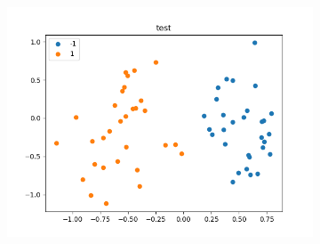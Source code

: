 \documentclass[a4paper]{article}
\begin{document}
\begin{figure}[H]
        \begin{subfigure}[b]{.45\linewidth}
            \includegraphics[width=\linewidth]{../../img/pca-test.png}
        \end{subfigure}
\end{figure}
\end{document}
